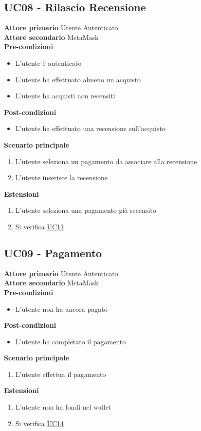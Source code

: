 \subsection{UC08 - Rilascio Recensione}
\textbf{Attore primario} Utente Autenticato \\
\textbf{Attore secondario} MetaMask \\
\textbf{Pre-condizioni}
\begin{itemize}
    \item L'utente è autenticato
    \item L'utente ha effettuato almeno un acquisto
    \item L'utente ha acquisti non recensiti
\end{itemize}
\textbf{Post-condizioni}
\begin{itemize}
    \item L'utente ha effettuato una recensione sull'acquisto
\end{itemize}
\textbf{Scenario principale}
\begin{enumerate}
    \item L'utente seleziona un pagamento da associare alla recensione
    \item L'utente inserisce la recensione
\end{enumerate}
\textbf{Estensioni}
\begin{enumerate}
    \item L'utente seleziona una pagamento già recensito
    \item Si verifica \hyperref[UC13]{UC13}
\end{enumerate}

\subsection{UC09 - Pagamento}
\textbf{Attore primario} Utente Autenticato \\
\textbf{Attore secondario} MetaMask \\
\textbf{Pre-condizioni}
\begin{itemize}
    \item L'utente non ha ancora pagato
\end{itemize}
\textbf{Post-condizioni}
\begin{itemize}
    \item L'utente ha completato il pagamento
\end{itemize}
\textbf{Scenario principale}
\begin{enumerate}
    \item L'utente effettua il pagamento
\end{enumerate}
\textbf{Estensioni}
\begin{enumerate}
    \item L'utente non ha fondi nel wallet
    \item Si verifica \hyperref[UC14]{UC14}
\end{enumerate}

